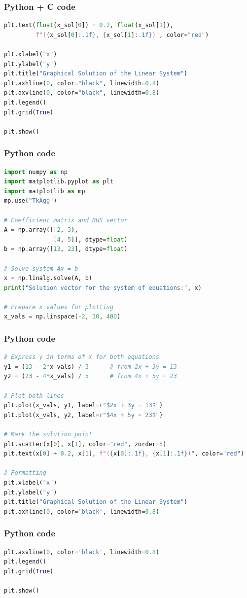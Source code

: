 \documentclass{beamer}
\begin{document}
\begin{frame}[fragile]
    \frametitle{Python + C code}

    \begin{lstlisting}[language=Python]
plt.text(float(x_sol[0]) + 0.2, float(x_sol[1]),
         f"({x_sol[0]:.1f}, {x_sol[1]:.1f})", color="red")

plt.xlabel("x")
plt.ylabel("y")
plt.title("Graphical Solution of the Linear System")
plt.axhline(0, color="black", linewidth=0.8)
plt.axvline(0, color="black", linewidth=0.8)
plt.legend()
plt.grid(True)

plt.show()
\end{lstlisting}
\end{frame}
\begin{frame}[fragile]
    \frametitle{Python code}
    \begin{lstlisting}[language=Python]
import numpy as np
import matplotlib.pyplot as plt
import matplotlib as mp
mp.use("TkAgg")

# Coefficient matrix and RHS vector
A = np.array([[2, 3],
              [4, 5]], dtype=float)
b = np.array([13, 23], dtype=float)

# Solve system Ax = b
x = np.linalg.solve(A, b)
print("Solution vector for the system of equations:", x)

# Prepare x values for plotting
x_vals = np.linspace(-2, 10, 400)
    \end{lstlisting}
\end{frame}
\begin{frame}[fragile]
    \frametitle{Python code}

    \begin{lstlisting}[language=Python]
# Express y in terms of x for both equations
y1 = (13 - 2*x_vals) / 3      # from 2x + 3y = 13
y2 = (23 - 4*x_vals) / 5      # from 4x + 5y = 23

# Plot both lines
plt.plot(x_vals, y1, label=r"$2x + 3y = 13$")
plt.plot(x_vals, y2, label=r"$4x + 5y = 23$")

# Mark the solution point
plt.scatter(x[0], x[1], color="red", zorder=5)
plt.text(x[0] + 0.2, x[1], f"({x[0]:.1f}, {x[1]:.1f})", color="red")

# Formatting
plt.xlabel("x")
plt.ylabel("y")
plt.title("Graphical Solution of the Linear System")
plt.axhline(0, color='black', linewidth=0.8)
           \end{lstlisting}
\end{frame}
\begin{frame}[fragile]
    \frametitle{Python code}

    \begin{lstlisting}[language=Python]
plt.axvline(0, color='black', linewidth=0.8)
plt.legend()
plt.grid(True)

plt.show()
    \end{lstlisting}
\end{frame}
\end{document}
